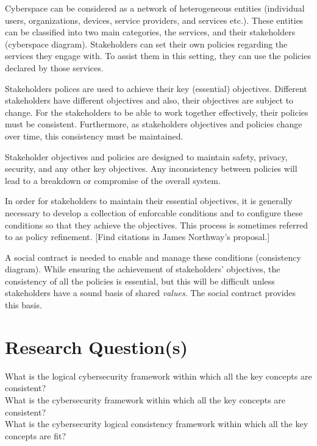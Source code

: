 Cyberspace can be considered as a network of heterogeneous entities
(individual users, organizations, devices, service providers, and
services etc.). These entities can be classified into two main categories,
the services, and their stakeholders (cyberspace diagram).  Stakeholders
can set their own policies regarding the services they engage with. To
assist them in this setting, they can use the policies declared by
those services.

Stakeholders polices are used to achieve their key (essential)
objectives. Different stakeholders have different objectives and also,
their objectives are subject to change.  For the stakeholders to be
able to work together effectively, their policies must be consistent.
Furthermore, as stakeholders objectives and policies change over time,
this consistency must be maintained.

Stakeholder objectives and policies are designed to maintain safety, privacy, security,
and any other key objectives. Any inconsistency between policies will lead
to a breakdown or compromise of the overall system.

In order for stakeholders to maintain their essential objectives, it is
generally necessary to develop a collection of enforcable conditions and to configure these conditions so that they achieve the objectives. This process is sometimes referred to as policy refinement. [Find citations in James Northway's
proposal.]

A social contract is needed to enable and manage these conditions (consistency diagram).  While ensuring the achievement of stakeholders’ objectives, the consistency of all the policies is essential, but this will be difficult unless stakeholders have a sound basis of shared {\em values}. The social contract provides this basis.
\section{Research Question(s)}
\if
What is the logical cybersecurity framework within which all the key concepts are consistent?\\
What is the cybersecurity framework within which all the key concepts are consistent?\\
What is the cybersecurity logical consistency framework within which all the key concepts are fit?\\
\fi


